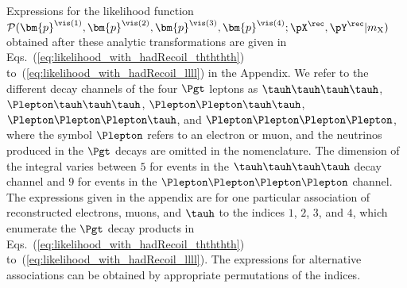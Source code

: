 Expressions for the likelihood function 
$\mathcal{P}(\bm{p}^{\vis(1)},\bm{p}^{\vis(2)},\bm{p}^{\vis(3)},\bm{p}^{\vis(4)};\pX^{\rec},\pY^{\rec}|m_{\textrm{X}})$
obtained after these analytic transformations 
are given in Eqs.~(\ref{eq:likelihood_with_hadRecoil_thththth}) to~(\ref{eq:likelihood_with_hadRecoil_llll}) in the Appendix.
We refer to the different decay channels of the four $\Pgt$ leptons as 
$\tauh\tauh\tauh\tauh$, $\Plepton\tauh\tauh\tauh$, $\Plepton\Plepton\tauh\tauh$, $\Plepton\Plepton\Plepton\tauh$, and $\Plepton\Plepton\Plepton\Plepton$, 
where the symbol $\Plepton$ refers to an electron or muon,
and the neutrinos produced in the $\Pgt$ decays are omitted in the nomenclature.
The dimension of the integral varies between $5$ for events in the $\tauh\tauh\tauh\tauh$ decay channel and $9$ for events in the $\Plepton\Plepton\Plepton\Plepton$ channel.
The expressions given in the appendix are for one particular association of reconstructed electrons, muons, and $\tauh$ 
to the indices $1$, $2$, $3$, and $4$, which enumerate the $\Pgt$ decay products in Eqs.~(\ref{eq:likelihood_with_hadRecoil_thththth}) to~(\ref{eq:likelihood_with_hadRecoil_llll}).
The expressions for alternative associations can be obtained by appropriate permutations of the indices.

